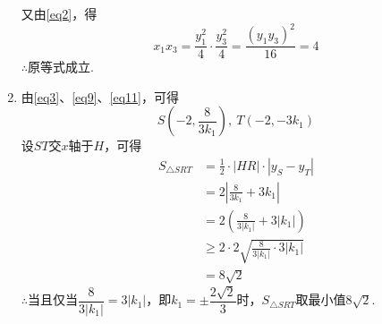 \documentclass[UTF8, 12pt, a4paper]{ctexart}
\begin{document}
\begin{enumerate}
又由\eqref{eq2}，得
\begin{equation}
    x_1x_3=\frac{y_1^2}{4}\cdot\frac{y_3^2}{4}=\frac{\left(y_1y_3 \right)^2}{16}=4
\end{equation}
$\therefore$原等式成立.
\item \label{q7}由\eqref{eq3}、\eqref{eq9}、\eqref{eq11}，可得
\[S\left(-2,\frac{8}{3k_1} \right),\ T\left(-2,-3k_1 \right)\]
设$ST$交$x$轴于$H$，可得
\begin{align*}
S_{\triangle SRT}&=\frac{1}{2}\cdot\left|HR \right|\cdot\left|y_S-y_T \right|\\
&=2\left|\frac{8}{3k_1}+3k_1 \right|\\
&=2\left(\frac{8}{3\left|k_1\right|}+3\left|k_1\right| \right)\\
&\ge 2\cdot2\sqrt{\frac{8}{3\left|k_1\right|}\cdot3\left|k_1\right|} \\
&=8\sqrt{2}
\end{align*}
$\therefore$当且仅当$\dfrac{8}{3\left|k_1\right|}=3\left|k_1\right|$，即$k_1=\pm\dfrac{2\sqrt{2}}{3}$时，$S_{\triangle SRT}$取最小值$8\sqrt{2}$.
\end{enumerate}
\end{document}
